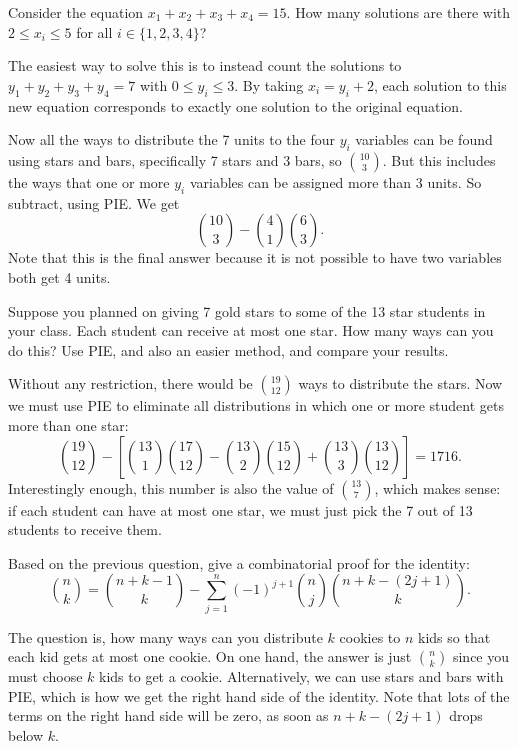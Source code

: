 \begin{questions}
\question Consider the equation $x_1 + x_2 + x_3 + x_4 = 15$.  How many solutions are there with $2 \le x_i \le 5$ for all $i \in \{1,2,3,4\}$?

	\begin{answer}
	The easiest way to solve this is to instead count the solutions to $y_1 + y_2 + y_3 + y_4 = 7$ with $0 \le y_i \le 3$.  By taking $x_i = y_i+2$, each solution to this new equation corresponds to exactly one solution to the original equation.  
	
	Now all the ways to distribute the 7 units to the four $y_i$ variables can be found using stars and bars, specifically 7 stars and 3 bars, so ${10 \choose 3}$.  But this includes the ways that one or more $y_i$ variables can be assigned more than 3 units.  So subtract, using PIE.  We get 
	\[{10 \choose 3} - {4\choose 1} {6 \choose 3}.\]
	Note that this is the final answer because it is not possible to have two variables both get 4 units.
	\end{answer}


\question Suppose you planned on giving 7 gold stars to some of the 13 star students in your class.  Each student can receive at most one star.  How many ways can you do this?  Use PIE, and also an easier method, and compare your results.

	\begin{answer}
		Without any restriction, there would be ${19\choose 12}$ ways to distribute the stars.  Now we must use PIE to eliminate all distributions in which one or more student gets more than one star:
		\[{19 \choose 12} - \left[{13 \choose 1}{17 \choose 12} - {13\choose 2}{15 \choose 12} + {13\choose 3}{13 \choose 12}\right] = 1716.\]
		Interestingly enough, this number is also the value of ${13 \choose 7}$, which makes sense: if each student can have at most one star, we must just pick the 7 out of 13 students to receive them.
	\end{answer}



\question Based on the previous question, give a combinatorial proof for the identity:
\[{n \choose k} = {n+k-1 \choose k} - \sum_{j=1}^n (-1)^{j+1}{n \choose j}{n+k-(2j+1) \choose k}.\]

	\begin{answer}
	The question is, how many ways can you distribute $k$ cookies to $n$ kids so that each kid gets at most one cookie.  On one hand, the answer is just ${n \choose k}$ since you must choose $k$ kids to get a cookie.  Alternatively, we can use stars and bars with PIE, which is how we get the right hand side of the identity.  Note that lots of the terms on the right hand side will be zero, as soon as $n+k-(2j+1)$ drops below $k$. 
	\end{answer}




\end{questions}
